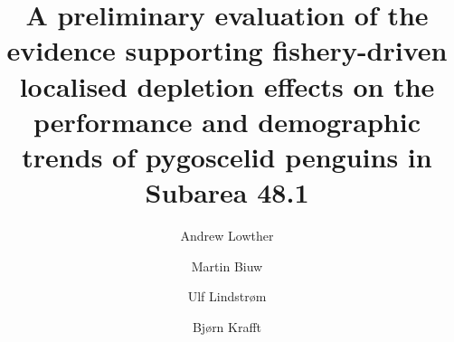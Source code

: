 \documentclass[]{elsarticle} %
\begin{document}
\begin{frontmatter}

  \title{A preliminary evaluation of the evidence supporting fishery-driven
localised depletion effects on the performance and demographic trends of
pygoscelid penguins in Subarea 48.1}
    \author[Norwegian Polar Institute]{Andrew Lowther}
    \author[Institute of Marine Research (Tromsø)]{Martin Biuw}
    \author[Institute of Marine Research (Tromsø)]{Ulf Lindstrøm}
    \author[Institute of Marine Research (Bergen)]{Bjørn Krafft}
      \address[Norwegian Polar Institute]{Norwegian Polar Institute, Research Department, Fram Centre, Hjalmar
Johansensgata 14, Tromsø, Norway, 9297}
    \address[Institute of Marine Research (Tromsø)]{Institute of Marine Research, Tromsø 9296, Norway}
    \address[Institute of Marine Research (Bergen)]{Institute of Marine Research, Nordnesgaten 50, 5005 Bergen, Norway}
  

\end{frontmatter}
\end{document}
